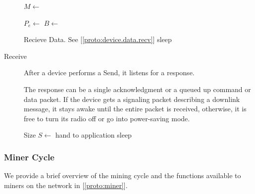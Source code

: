 \documentclass[UTF8, 10pt, nonatbib, nocopyrightspace, reprint]{sigplanconf}
\newenvironment{protocol}[2]{
  \begin{algorithm}[!htb]
    \DontPrintSemicolon
    \caption{#1}\label{#2}
}{
  \end{algorithm}
  \FloatBarrier
}
\newcommand{\protoref}[1]{[\autoref{#1}]}
\begin{document}
\begin{description}
\begin{protocol}{Device Send Data}{proto:device.data.send}
       {
        $M \leftarrow $  \;
         \;
        \BlankLine

        $P_e \leftarrow $  \;
        $B \leftarrow $  \;
         \;
        \BlankLine

         {
           {
            Recieve Data. See \protoref{proto:device.data.recv}
          }
           {sleep}
        }
      }
    \end{protocol}


  \item [Receive] After a device performs a Send, it listens for a response.

    The response can be a single acknowledgment or a queued up command or data packet. If the device gets a signaling packet describing a downlink message, it stays awake until the entire packet is received, otherwise, it is free to turn its radio off or go into power-saving mode.

    \begin{protocol}{Device Receive Data}{proto:device.data.recv}

       {
        Size $S \leftarrow $  \;
         {
           {hand to application}
           {sleep}
        }
      }
    \end{protocol}


\end{description}


\subsubsection{Miner Cycle}\label{mining}

We provide a brief overview of the mining cycle and the functions available to miners on the network in \protoref{proto:miner}.
\end{document}
